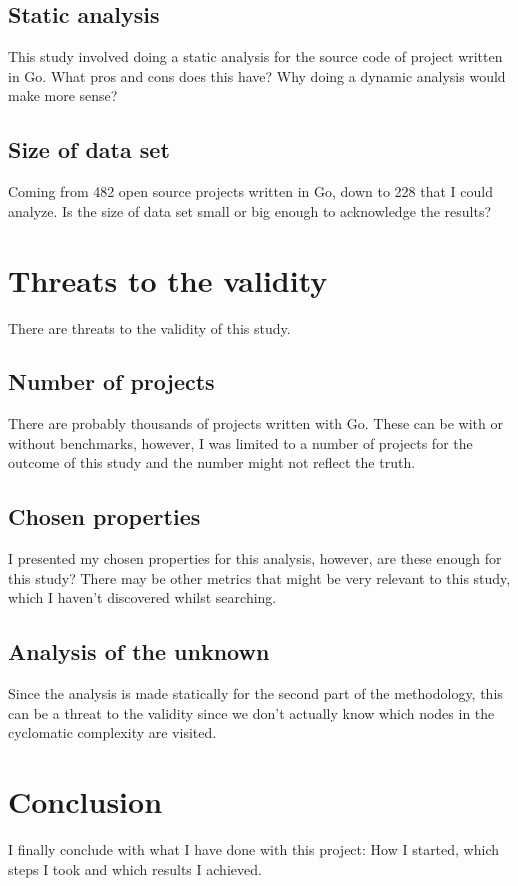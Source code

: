 \documentclass{seal_thesis}
\begin{document}
\section{Static analysis}
This study involved doing a static analysis for the source code of project written in Go. What pros and cons does this have? Why doing a dynamic analysis would make more sense?

\section{Size of data set}
Coming from 482 open source projects written in Go, down to 228 that I could analyze. Is the size of data set small or big enough to acknowledge the results?

\chapter{Threats to the validity}
There are threats to the validity of this study.

\section{Number of projects}
There are probably thousands of projects written with Go. These can be with or without benchmarks, however, I was limited to a number of projects for the outcome of this study and the number might not reflect the truth.

\section{Chosen properties}
I presented my chosen properties for this analysis, however, are these enough for this study? There may be other metrics that might be very relevant to this study, which I haven't discovered whilst searching.

\section{Analysis of the unknown}
Since the analysis is made statically for the second part of the methodology, this can be a threat to the validity since we don't actually know which nodes in the cyclomatic complexity are visited.

\chapter{Conclusion}
I finally conclude with what I have done with this project: How I started, which steps I took and which results I achieved.


\backmatter


\end{document}
